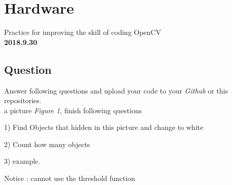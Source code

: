 \section*{Hardware} 

Practice for improving the skill of coding OpenCV\\

\textbf{2018.9.30}

\subsection*{Question}

Answer following questions and upload your code to your \emph{Github} or this repositories.\\

 a picture \emph{Figure 1}, finish following questions

1) Find Objects that hidden in this picture and change to white

2) Count how many objects

3) example. \cite{lamport94}

\noindent\textsf{Notice} : cannot use the threshold function
\clearpage